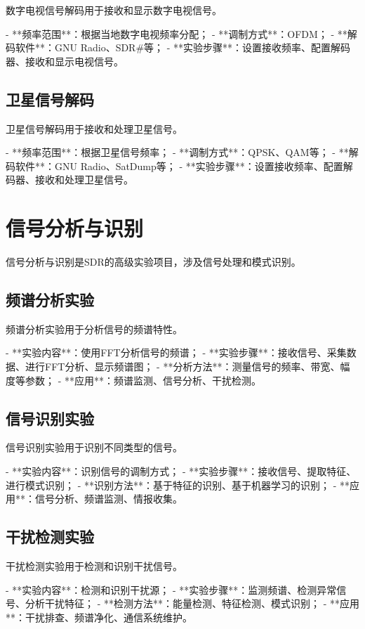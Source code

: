 ﻿\documentclass[UTF8]{ctexbook}
\begin{document}
数字电视信号解码用于接收和显示数字电视信号。

- **频率范围**：根据当地数字电视频率分配；
- **调制方式**：OFDM；
- **解码软件**：GNU Radio、SDR\#等；
- **实验步骤**：设置接收频率、配置解码器、接收和显示电视信号。

\subsection{卫星信号解码}

卫星信号解码用于接收和处理卫星信号。

- **频率范围**：根据卫星信号频率；
- **调制方式**：QPSK、QAM等；
- **解码软件**：GNU Radio、SatDump等；
- **实验步骤**：设置接收频率、配置解码器、接收和处理卫星信号。

\section{信号分析与识别}

信号分析与识别是SDR的高级实验项目，涉及信号处理和模式识别。

\subsection{频谱分析实验}

频谱分析实验用于分析信号的频谱特性。

- **实验内容**：使用FFT分析信号的频谱；
- **实验步骤**：接收信号、采集数据、进行FFT分析、显示频谱图；
- **分析方法**：测量信号的频率、带宽、幅度等参数；
- **应用**：频谱监测、信号分析、干扰检测。

\subsection{信号识别实验}

信号识别实验用于识别不同类型的信号。

- **实验内容**：识别信号的调制方式；
- **实验步骤**：接收信号、提取特征、进行模式识别；
- **识别方法**：基于特征的识别、基于机器学习的识别；
- **应用**：信号分析、频谱监测、情报收集。

\subsection{干扰检测实验}

干扰检测实验用于检测和识别干扰信号。

- **实验内容**：检测和识别干扰源；
- **实验步骤**：监测频谱、检测异常信号、分析干扰特征；
- **检测方法**：能量检测、特征检测、模式识别；
- **应用**：干扰排查、频谱净化、通信系统维护。
\end{document}
